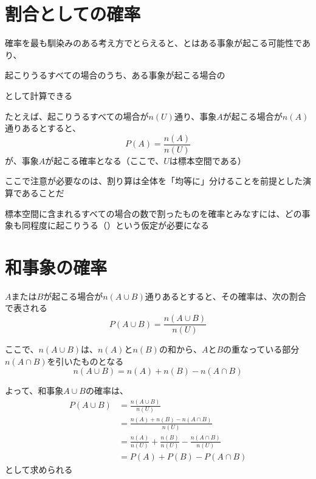 \documentclass[../../../topic_probability-statistics]{subfiles}
\begin{document}
\sectionline
\section{割合としての確率}

確率を最も馴染みのある考え方でとらえると、とはある事象が起こる可能性であり、
\begin{shaded}
  起こりうるすべての場合のうち、ある事象が起こる場合の
\end{shaded}
として計算できる

\br

たとえば、起こりうるすべての場合が$n(U)$通り、事象$A$が起こる場合が$n(A)$通りあるとすると、
\begin{equation*}
  P(A) = \frac{n(A)}{n(U)}
\end{equation*}
が、事象$A$が起こる確率となる（ここで、$U$は標本空間である）

\br

ここで注意が必要なのは、割り算は全体を「均等に」分けることを前提とした演算であることだ

\br

標本空間に含まれるすべての場合の数で割ったものを確率とみなすには、どの事象も同程度に起こりうる（）という仮定が必要になる

\sectionline
\section{和事象の確率}

$A$または$B$が起こる場合が$n(A \cup B)$通りあるとすると、その確率は、次の割合で表される
\begin{equation*}
  P(A \cup B) = \frac{n(A \cup B)}{n(U)}
\end{equation*}

ここで、$n(A \cup B)$は、$n(A)$と$n(B)$の和から、$A$と$B$の重なっている部分$n(A \cap B)$を引いたものとなる
\begin{equation*}
  n(A \cup B) = n(A) + n(B) - n(A \cap B)
\end{equation*}

よって、和事象$A \cup B$の確率は、
\begin{align*}
  P(A \cup B) & = \frac{n(A \cup B)}{n(U)}                                         \\
              & = \frac{n(A) + n(B) - n(A \cap B)}{n(U)}                           \\
              & = \frac{n(A)}{n(U)} + \frac{n(B)}{n(U)} - \frac{n(A \cap B)}{n(U)} \\
              & = P(A) + P(B) - P(A \cap B)
\end{align*}
として求められる
\end{document}
